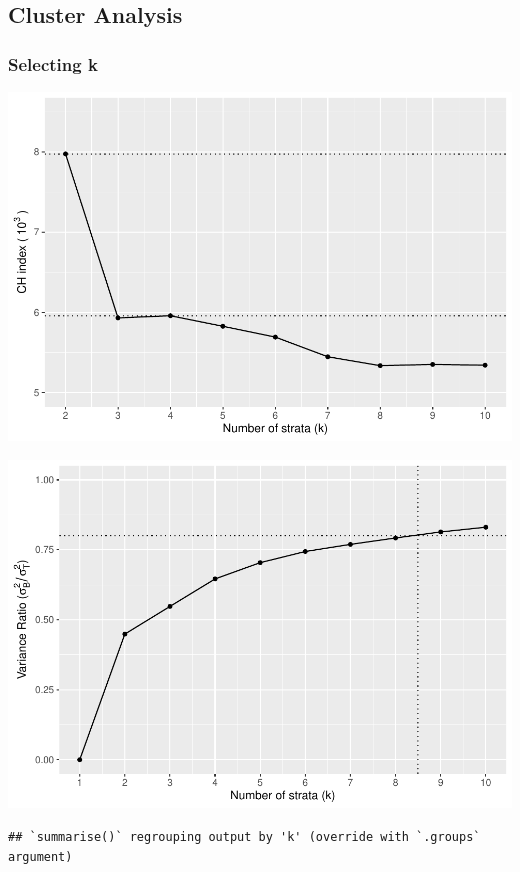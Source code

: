 \documentclass[
  english,
  man,floatsintext]{apa6}
\begin{document}
\hypertarget{cluster-analysis}{%
\subsection{Cluster Analysis}\label{cluster-analysis}}

\hypertarget{selecting-k}{%
\subsubsection{Selecting k}\label{selecting-k}}

\includegraphics{5---Analysis_files/figure-latex/unnamed-chunk-3-1.pdf}

\includegraphics{5---Analysis_files/figure-latex/unnamed-chunk-4-1.pdf}

\begin{verbatim}
## `summarise()` regrouping output by 'k' (override with `.groups` argument)
\end{verbatim}
\end{document}
